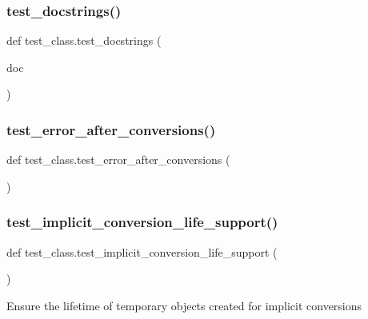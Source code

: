\subsubsection{\texorpdfstring{test\_docstrings()}{test\_docstrings()}}
{\footnotesize\ttfamily def test\+\_\+class.\+test\+\_\+docstrings (\begin{DoxyParamCaption}\item[{}]{doc }\end{DoxyParamCaption})}

\mbox{\label{namespacetest__class_aa00b22febc5e2eb6f9ac501432a61ec2}} 
\subsubsection{\texorpdfstring{test\_error\_after\_conversions()}{test\_error\_after\_conversions()}}
{\footnotesize\ttfamily def test\+\_\+class.\+test\+\_\+error\+\_\+after\+\_\+conversions (\begin{DoxyParamCaption}{ }\end{DoxyParamCaption})}

\mbox{\label{namespacetest__class_a9b105e0e35185b07ffcb69eec1b68d69}} 
\subsubsection{\texorpdfstring{test\_implicit\_conversion\_life\_support()}{test\_implicit\_conversion\_life\_support()}}
{\footnotesize\ttfamily def test\+\_\+class.\+test\+\_\+implicit\+\_\+conversion\+\_\+life\+\_\+support (\begin{DoxyParamCaption}{ }\end{DoxyParamCaption})}

\begin{DoxyVerb}Ensure the lifetime of temporary objects created for implicit conversions\end{DoxyVerb}
 \mbox{\label{namespacetest__class_a6ad1d320c0df466ea08032b565ba5ba1}} 
